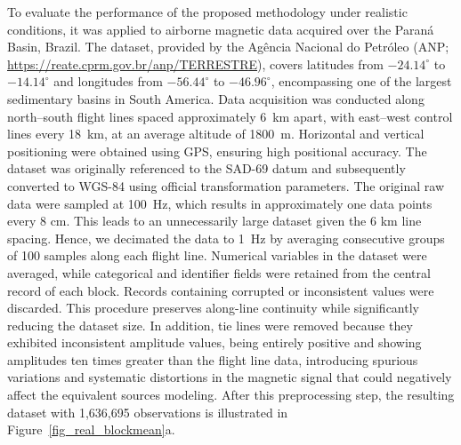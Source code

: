 \documentclass[a4paper,oneside,10pt]{book}
\begin{document}
To evaluate the performance of the proposed methodology under realistic
conditions, it was applied to airborne magnetic data acquired over the Paraná
Basin, Brazil.
The dataset, provided by the Agência Nacional do Petróleo (ANP;
\url{https://reate.cprm.gov.br/anp/TERRESTRE}),
covers latitudes from $-24.14^{\circ}$ to
$-14.14^{\circ}$ and longitudes from $-56.44^{\circ}$ to $-46.96^{\circ}$,
encompassing one of the largest sedimentary basins in South America.
Data acquisition was conducted along north--south flight lines spaced
approximately 6~km apart, with east--west control lines every 18~km, at an
average altitude of 1800~m. Horizontal and vertical positioning were obtained
using GPS, ensuring high positional accuracy. The dataset was originally
referenced to the SAD-69 datum and subsequently converted to WGS-84 using
official transformation parameters.
The original raw data were sampled at 100~Hz, which results in approximately
one data points every 8 cm.
This leads to an unnecessarily large dataset given the 6 km line spacing.
Hence, we decimated the data to 1~Hz by averaging consecutive groups of 100
samples along each flight line.
Numerical variables in the dataset were averaged, while categorical and identifier fields
were retained from the central record of each block. Records containing
corrupted or inconsistent values were discarded. This procedure preserves
along-line continuity while significantly reducing the dataset size. In
addition, tie lines were removed because they exhibited inconsistent amplitude values,
being entirely positive and showing amplitudes ten times greater than the
flight line data, introducing spurious variations and systematic
distortions in the magnetic signal that could negatively affect the equivalent
sources modeling. After this preprocessing step, the resulting dataset with
1,636,695 observations is illustrated in Figure~\ref{fig_real_blockmean}a.
\end{document}
